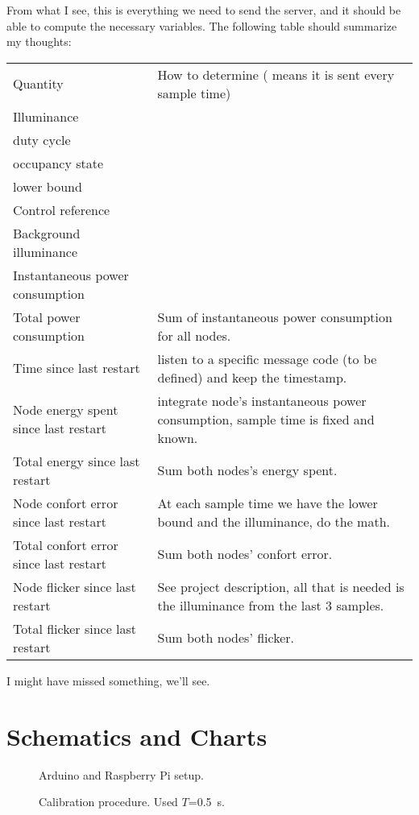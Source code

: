 \documentclass[english,fira]{ist-report}
\begin{document}
From what I see, this is everything we need to send the server, and it should be able to compute the necessary variables. The following table should summarize my thoughts:
\begin{table}[h]
	\centering
	\begin{tabularx}{\linewidth}{l|X}
		Quantity & How to determine (\ccheckmark{} means it is sent every sample time) \\
		Illuminance & \ccheckmark{} \\
		duty cycle  & \ccheckmark{} \\
		occupancy state & \ccheckmark{} \\
		lower bound & \ccheckmark{} \\
		Control reference & \ccheckmark{} \\
		Background illuminance & \ccheckmark{} \\
		Instantaneous power consumption & \ccheckmark{} \\
		Total power consumption & Sum of instantaneous power consumption for all nodes. \\
		Time since last restart & listen to a specific message code (to be defined) and keep the timestamp. \\
		Node energy spent since last restart & integrate node's instantaneous power consumption, sample time is fixed and known. \\
		Total energy since last restart & Sum both nodes's energy spent. \\
		Node confort error since last restart & At each sample time we have the lower bound and the illuminance, do the math. \\
		Total confort error since last restart & Sum both nodes' confort error. \\
		Node flicker since last restart & See project description, all that is needed is the illuminance from the last 3 samples. \\
		Total flicker since last restart & Sum both nodes' flicker.
	\end{tabularx}
\end{table}

I might have missed something, we'll see.

\section{Schematics and Charts}

\begin{figure}[ht]
	\centering
	
	\caption{Arduino and Raspberry Pi setup.}
\end{figure}

\begin{figure}[ht]
	\centering
	
	\caption{Calibration procedure. Used $T$=\SI{0.5}{\second}.}
	\label{fig:calib}
\end{figure}

\pagebreak
\printbibliography

\listoftodos
\end{document}
